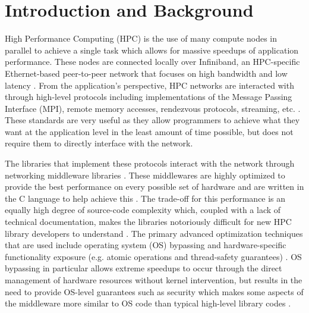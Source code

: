 \section{Introduction and Background}
\label{sec:intro}

High Performance Computing (HPC) is the use of many compute nodes in parallel to achieve a single task which allows for massive speedups of application performance. These nodes are connected locally over Infiniband, an HPC-specific Ethernet-based peer-to-peer network that focuses on high bandwidth and low latency \cite{infiniband_half_round_trip}. From the application's perspective, HPC networks are interacted with through high-level protocols including implementations of the Message Passing Interface (MPI), remote memory accesses, rendezvous protocols, streaming, etc. \cite{mpiforum}. These standards are very useful as they allow programmers to achieve what they want at the application level in the least amount of time possible, but does not require them to directly interface with the network.

The libraries that implement these protocols interact with the network through networking middleware libraries \cite{10.1007/978-3-540-72586-2_111}. These middlewares are highly optimized to provide the best performance on every possible set of hardware and are written in the C language to help achieve this \cite{7194625}. The trade-off for this performance is an equally high degree of source-code complexity which, coupled with a lack of technical documentation, makes the libraries notoriously difficult for new HPC library developers to understand \cite{1311050}. The primary advanced optimization techniques that are used include operating system (OS) bypassing and hardware-specific functionality exposure (e.g. atomic operations and thread-safety guarantees) \cite{ucx_paper}. OS bypassing in particular allows extreme speedups to occur through the direct management of hardware resources without kernel intervention, but results in the need to provide OS-level guarantees such as security which makes some aspects of the middleware more similar to OS code than typical high-level library codes \cite{ucx_paper, ucx_github}.


